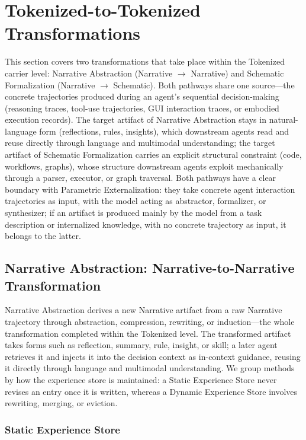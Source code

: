 \section{Tokenized-to-Tokenized Transformations}
\label{sec:tok2tok}

This section covers two transformations that take place within the Tokenized carrier level: Narrative Abstraction (Narrative $\rightarrow$ Narrative) and Schematic Formalization (Narrative $\rightarrow$ Schematic). Both pathways share one source---the concrete trajectories produced during an agent's sequential decision-making (reasoning traces, tool-use trajectories, GUI interaction traces, or embodied execution records). The target artifact of Narrative Abstraction stays in natural-language form (reflections, rules, insights), which downstream agents read and reuse directly through language and multimodal understanding; the target artifact of Schematic Formalization carries an explicit structural constraint (code, workflows, graphs), whose structure downstream agents exploit mechanically through a parser, executor, or graph traversal. Both pathways have a clear boundary with Parametric Externalization: they take concrete agent interaction trajectories as input, with the model acting as abstractor, formalizer, or synthesizer; if an artifact is produced mainly by the model from a task description or internalized knowledge, with no concrete trajectory as input, it belongs to the latter.

\subsection{Narrative Abstraction: Narrative-to-Narrative Transformation}
\label{sec:narrative-abstraction}

Narrative Abstraction derives a new Narrative artifact from a raw Narrative trajectory through abstraction, compression, rewriting, or induction---the whole transformation completed within the Tokenized level. The transformed artifact takes forms such as reflection, summary, rule, insight, or skill; a later agent retrieves it and injects it into the decision context as in-context guidance, reusing it directly through language and multimodal understanding. We group methods by how the experience store is maintained: a Static Experience Store never revises an entry once it is written, whereas a Dynamic Experience Store involves rewriting, merging, or eviction.

\subsubsection{Static Experience Store}

